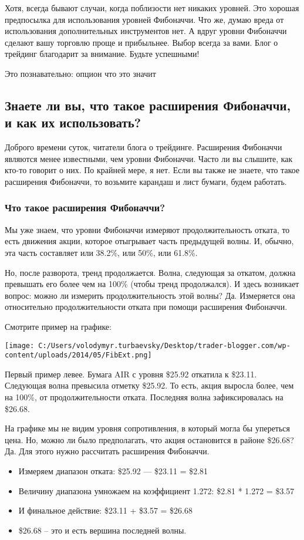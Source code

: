 \documentclass[a5paper]{article}
\begin{document}
Хотя, всегда бывают случаи, когда поблизости нет никаких уровней. Это хорошая предпосылка для использования уровней Фибоначчи. Что же, думаю вреда от использования дополнительных инструментов нет. А вдруг уровни Фибоначчи сделают вашу торговлю проще и прибыльнее. Выбор всегда за вами. Блог о трейдинг благодарит за внимание. Будьте успешными!


Это познавательно: опцион что это значит

\subsection{Знаете ли вы, что такое расширения Фибоначчи, и как их
  использовать?}

Доброго времени суток, читатели блога о трейдинге. Расширения
Фибоначчи являются менее известными, чем уровни Фибоначчи. Часто ли вы
слышите, как кто-то говорит о них. По крайней мере, я нет. Если вы
также не знаете, что такое расширения Фибоначчи, то возьмите карандаш
и лист бумаги, будем работать.

\subsubsection{Что такое расширения Фибоначчи?}

Мы уже знаем, что уровни Фибоначчи измеряют продолжительность отката, то есть движения акции, которое отыгрывает часть предыдущей волны. И, обычно, эта часть составляет или 38.2\%, или 50\%, или 61.8\%.

Но, после разворота, тренд продолжается. Волна, следующая за откатом, должна превышать его более чем на 100\% (чтобы тренд продолжался). И здесь возникает вопрос: можно ли измерить продолжительность этой волны? Да. Измеряется она относительно продолжительности отката при помощи расширения Фибоначчи.

Смотрите пример на графике:

\texttt{[image: C:/Users/volodymyr.turbaevsky/Desktop/trader-blogger.com/wp-content/uploads/2014/05/FibExt.png]}

Первый пример левее. Бумага AIR с уровня \$25.92 откатила к \$23.11. Следующая волна превысила отметку \$25.92. То есть, акция выросла более, чем на 100\%, от продолжительности отката. Последняя волна зафиксировалась на \$26.68.

На графике мы не видим уровня сопротивления, в который могла бы упереться цена. Но, можно ли было предполагать, что акция остановится в районе \$26.68? Да. Для этого нужно рассчитать расширения Фибоначчи.
\begin{itemize}
\item     Измеряем диапазон отката: \$25.92 — \$23.11 = \$2.81
\item     Величину диапазона умножаем на коэффициент 1.272: \$2.81 * 1.272 = \$3.57
\item     И финальное действие: \$23.11 + \$3.57 = \$26.68
\item     \$26.68 – это и есть вершина последней волны.
\end{itemize}
\end{document}
